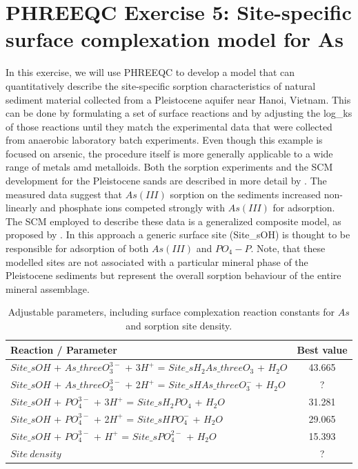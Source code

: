 \section[PHREEQC Exercise 5: Site-specific surface complexation model for As]{PHREEQC Exercise 5: Site-specific surface complexation model for As}

In this exercise, we will use PHREEQC to develop a model that can quantitatively describe
the site-specific sorption characteristics of natural sediment material collected from a 
Pleistocene aquifer near Hanoi, Vietnam. This can be done by formulating a set of surface reactions and by adjusting 
the log\_ks of those reactions until they match the experimental data that were
collected from anaerobic laboratory batch experiments. Even though this example is 
focused on arsenic, the procedure itself is more generally applicable to a wide range of metals amd metalloids.
Both the sorption experiments and the SCM development for the Pleistocene sands are described 
in more detail by \cite{rathi2017a}. 
The measured data suggest that $As(III)$ sorption on the sediments increased non-linearly and phosphate ions competed strongly with $As(III)$ for adsorption. 
The SCM employed to describe these data is a generalized composite model, as proposed by \cite{Davis19982820}. 
In this approach a generic surface site ({\color{blue}Site\_sOH}) is thought to be responsible for adsorption 
of both $As(III)$ and $PO_4-P$. Note, that these modelled sites are not associated with a particular mineral phase of the Pleistocene sediments but represent the overall sorption behaviour of the entire mineral assemblage. 

\begin{table}[h]
\caption{Adjustable parameters, including surface complexation reaction constants 
for $As$ and sorption site density.}
\begin{center}
\begin{tabular}{l c}
\hline
 Reaction / Parameter & Best value          \\ \hline
$Site\_sOH$ + $As\_threeO_3^{3-}$ + 3$H^+$ = $Site\_sH_2As\_threeO_3$   + $H_2O$  & 43.665 \\
$Site\_sOH$ + $As\_threeO_3^{3-}$ + 2$H^+$ = $Site\_sHAs\_threeO_3^{-}$ + $H_2O$	&  ? \\
$Site\_sOH$ + $PO_4^{3-}$ + 3$H^+$         = $Site\_sH_2PO_4$           + $H_2O$	&   31.281 \\
$Site\_sOH$ + $PO_4^{3-}$ + 2$H^+$         = $Site\_sHPO_4^-$           + $H_2O$	&  29.065 \\
$Site\_sOH$ + $PO_4^{3-}$ + $H^+$          = $Site\_sPO_4^{2-}$         + $H_2O$	&  15.393   \\
$Site\ density$	& ? \\ \hline
\end{tabular}
\label{ex_as_scm}
\end{center}
\end{table}

